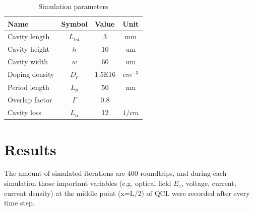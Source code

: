 \documentclass[11pt,final]{scrbook}
\begin{document}
\begin{table}[]
\centering
\caption{Simulation parameters}
\label{SIMparameter}
\begin{tabular}{llll}
\hline
\multicolumn{1}{|l|}{\textbf{Name}}  & \multicolumn{1}{l|}{\textbf{Symbol}} & \multicolumn{1}{l|}{\textbf{Value}} & \multicolumn{1}{l|}{\textbf{Unit}}         \\ \hline
\multicolumn{1}{|l|}{Cavity length}  & \multicolumn{1}{c|}{$L_{tot}$}       & \multicolumn{1}{c|}{3}              & \multicolumn{1}{c|}{mm}                    \\ %
\multicolumn{1}{|l|}{Cavity height}  & \multicolumn{1}{c|}{$h$}       & \multicolumn{1}{c|}{10}              & \multicolumn{1}{c|}{um}                    \\ 

\multicolumn{1}{|l|}{Cavity width}  & \multicolumn{1}{c|}{$w$}   & \multicolumn{1}{c|}{60}              & \multicolumn{1}{c|}{um}                    \\ %
\multicolumn{1}{|l|}{Doping density} & \multicolumn{1}{c|}{$D_{p}$ }        & \multicolumn{1}{c|}{1.5E16}         & \multicolumn{1}{c|}{$cm^{-3}$} 			   \\ %
\multicolumn{1}{|l|}{Period length}  & \multicolumn{1}{c|}{$L_{p}$}         & \multicolumn{1}{c|}{50}           & \multicolumn{1}{c|}{nm}                    \\ %
\multicolumn{1}{|l|}{Overlap factor} & \multicolumn{1}{c|}{$\Gamma$}          & \multicolumn{1}{c|}{0.8}          & \multicolumn{1}{c|}{}                      \\ 
 \multicolumn{1}{|l|}{Cavity loss}     &  \multicolumn{1}{c|}{$L_{\alpha}$}    &\multicolumn{1}{c|}{12}				&  \multicolumn{1}{c|}{$1/cm$} 						\\ \hline
\end{tabular}
\end{table}


\section{Results}
The amount of simulated iterations are 400 roundtrips, and during each simulation those important variables (e.g. optical field $E_{z}$, voltage, current, current density) at the middle point (x=L/2) of QCL were recorded after every time step.
\end{document}
